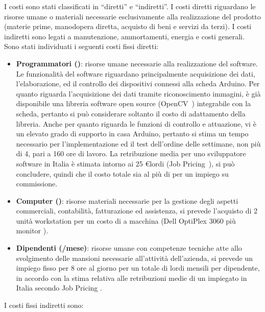 I costi sono stati classificati in “diretti” e “indiretti”. I costi diretti
riguardano le risorse umane o materiali necessarie esclusivamente alla
realizzazione del prodotto (materie prime, manodopera diretta, acquisto di beni
e servizi da terzi). I costi indiretti sono legati a manutenzione, ammortamenti,
energia e costi generali.\\
%
Sono stati individuati i seguenti costi fissi diretti:
\begin{itemize}
\item \textbf{Programmatori ()}: risorse umane necessarie alla
realizzazione del software.  Le funzionalità del software riguardano
principalmente acquisizione dei dati, l’elaborazione, ed il controllo dei
dispositivi connessi alla scheda Arduino.  Per quanto riguarda l’acquisizione
dei dati tramite riconoscimento immagini, è già disponibile una libreria
software open source (OpenCV~\cite{opencv}) integrabile con la scheda, pertanto
si può considerare soltanto il costo di adattamento della libreria. Anche per
quanto riguarda le funzioni di controllo e attuazione, vi è un elevato grado di
supporto in casa Arduino, pertanto si stima un tempo necessario per
l’implementazione ed il test dell’ordine delle settimane, non più di 4, pari a
160 ore di lavoro. La retribuzione media per uno sviluppatore software in Italia
è stimata intorno ai 25 \euro lordi (Job Pricing~\cite{corcom}), si può
concludere, quindi che il costo totale sia al più di  per un impiego
su commissione. 
\item \textbf{Computer ()}: risorse materiali
necessarie per la gestione degli aspetti commerciali, contabilità, fatturazione
ed assistenza, si prevede l’acquisto di 2 unità workstation per un costo di
 a macchina (Dell OptiPlex 3060 più monitor \cite{dell}).  
\item \textbf{Dipendenti (/mese)}: risorse umane con competenze
tecniche atte allo svolgimento delle mansioni necessarie all’attività
dell’azienda, si prevede un impiego fisso per 8 ore al giorno per un totale di
 lordi mensili per dipendente, in accordo con la stima relativa alle
retribuzioni medie di un impiegato in Italia secondo Job Pricing \cite{money}.
\end{itemize}
%
I costi fissi indiretti sono: 
